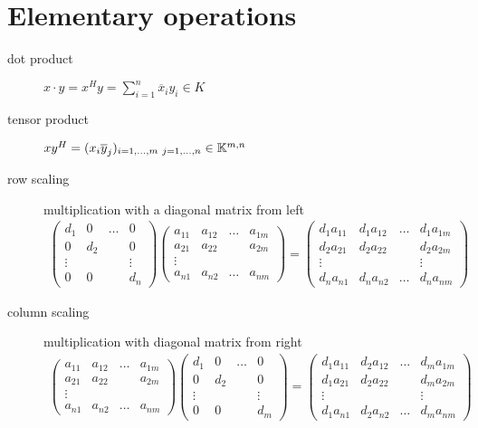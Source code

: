 		\section{Elementary operations}
			\begin{description}
			 \item[dot product] $x \cdot y = x^H y = \sum_{i=1}^n \overline x_i y_i \in K$ 
			 \item[tensor product] $x y^H = (x_i  \overline y_j)_{i = 1, \ldots, m \ j = 1, \ldots, n} \in \mathbb{K}^{m,n}$
			 \item[row scaling] multiplication with a diagonal matrix from left
				\begin{align*}
					\begin{pmatrix}
					 d_1 	&  0	&\ldots	& 0\\
					 0		& d_2	& 		& 0\\
					 \vdots &  		&		& \vdots\\
					 0 		& 0 	&		& d_n
					\end{pmatrix}
					\begin{pmatrix}
					 a_{11}	& a_{12} & \ldots & a_{1m}\\
					 a_{21} & a_{22} &		  & a_{2m}\\
					 \vdots &		 &		  & \\
					 a_{n1} & a_{n2} & \ldots & a_{nm}
					\end{pmatrix} = 
						\begin{pmatrix}
							d_1 a_{11}	& d_1 a_{12} & \ldots & d_1 a_{1m}\\
							d_2 a_{21} & d_2 a_{22} &		  & d_2 a_{2m}\\
							\vdots &		 &		  & \vdots\\
							d_n a_{n1} & d_n a_{n2} & \ldots & d_n a_{nm}
						\end{pmatrix}
				\end{align*}
			 \item[column scaling] multiplication with diagonal matrix from right
				\begin{align*}
					\begin{pmatrix}
					 a_{11}	& a_{12} & \ldots & a_{1m}\\
					 a_{21} & a_{22} &		  & a_{2m}\\
					 \vdots &		 &		  & \\
					 a_{n1} & a_{n2} & \ldots & a_{nm}
					\end{pmatrix} 
					\begin{pmatrix}
					 d_1 	&  0	&\ldots	& 0\\
					 0		& d_2	& 		& 0\\
					 \vdots &  		&		& \vdots\\
					 0 		& 0 	&		& d_m
					\end{pmatrix}	= 
						\begin{pmatrix}
							d_1 a_{11}	& d_2 a_{12} & \ldots & d_m a_{1m}\\
							d_1 a_{21} & d_2 a_{22} &		  & d_m a_{2m}\\
							\vdots &		 &		  & \vdots\\
							d_1 a_{n1} & d_2 a_{n2} & \ldots & d_m a_{nm}
						\end{pmatrix}
				\end{align*}
			\end{description}
